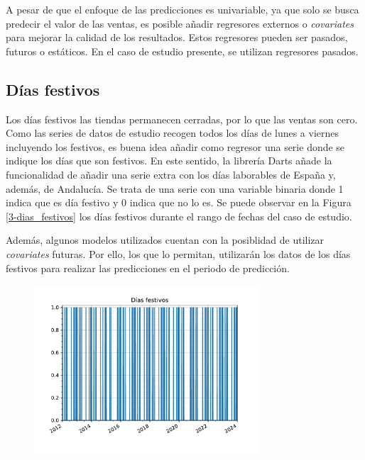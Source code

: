 A pesar de que el enfoque de las predicciones es univariable, ya que solo se busca predecir el valor de las ventas, es posible añadir regresores externos o \textit{covariates} para mejorar la calidad de los resultados. Estos regresores pueden ser pasados, futuros o estáticos. En el caso de estudio presente, se utilizan regresores pasados.

\subsection{Días festivos}

Los días festivos las tiendas permanecen cerradas, por lo que las ventas son cero. Como las series de datos de estudio recogen todos los días de lunes a viernes incluyendo los festivos, es buena idea añadir como regresor una serie donde se indique los días que son festivos. En este sentido, la librería Darts añade la funcionalidad de añadir una serie extra con los días laborables de España y, además, de Andalucía. Se trata de una serie con una variable binaria donde 1 indica que es día festivo y 0 indica que no lo es. Se puede observar en la Figura \ref*{3-dias_festivos} los días festivos durante el rango de fechas del caso de estudio.

Además, algunos modelos utilizados cuentan con la posiblidad de utilizar \textit{covariates} futuras. Por ello, los que lo permitan, utilizarán los datos de los días festivos para realizar las predicciones en el periodo de predicción.

\begin{figure}[H]
	{\includegraphics[width=0.75\textwidth]{imagenes/grafica_holidays.pdf}}
\end{figure}

